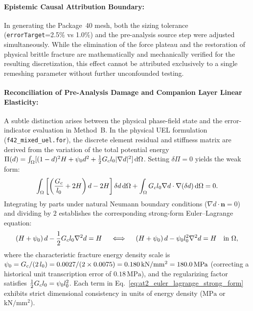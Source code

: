 \paragraph{Epistemic Causal Attribution Boundary:}
In generating the Package~40 mesh, both the sizing tolerance (\texttt{errorTarget}=2.5\% vs 1.0\%) and the pre-analysis source step were adjusted simultaneously. While the elimination of the force plateau and the restoration of physical brittle fracture are mathematically and mechanically verified for the resulting discretization, this effect cannot be attributed exclusively to a single remeshing parameter without further unconfounded testing.

\paragraph{Reconciliation of Pre-Analysis Damage and Companion Layer Linear Elasticity:}
A subtle distinction arises between the physical phase-field state and the error-indicator evaluation in Method~B. In the physical UEL formulation (\texttt{f42\_mixed\_uel.for}), the discrete element residual and stiffness matrix are derived from the variation of the total potential energy $\Pi(d) = \int_\Omega [ (1-d)^2 H + \psi_0 d^2 + \frac{1}{2} G_c l_0 |\nabla d|^2 ]\,\mathrm{d}\Omega$. Setting $\delta\Pi = 0$ yields the weak form:
\begin{equation}
\int_\Omega \left[ \left(\frac{G_c}{l_0} + 2H\right) d - 2H \right] \delta d\,\mathrm{d}\Omega + \int_\Omega G_c l_0 \nabla d \cdot \nabla(\delta d)\,\mathrm{d}\Omega = 0.
\label{eq:at2_weak_form_uel}
\end{equation}
Integrating by parts under natural Neumann boundary conditions ($\nabla d \cdot \mathbf{n} = 0$) and dividing by $2$ establishes the corresponding strong-form Euler--Lagrange equation:
\begin{equation}
(H + \psi_0)\,d - \frac{1}{2} G_c l_0 \nabla^2 d = H \quad \iff \quad (H + \psi_0)\,d - \psi_0 l_0^2 \nabla^2 d = H \quad \text{in } \Omega,
\label{eq:at2_euler_lagrange_strong_form}
\end{equation}
where the characteristic fracture energy density scale is $\psi_0 = G_c / (2\,l_0) = 0.0027 / (2 \times 0.0075) = 0.180\,\mathrm{kN/mm^2} = 180.0\,\mathrm{MPa}$ (correcting a historical unit transcription error of $0.18\,\mathrm{MPa}$), and the regularizing factor satisfies $\frac{1}{2} G_c l_0 = \psi_0 l_0^2$. Each term in Eq.~\eqref{eq:at2_euler_lagrange_strong_form} exhibits strict dimensional consistency in units of energy density ($\mathrm{MPa}$ or $\mathrm{kN/mm^2}$).

